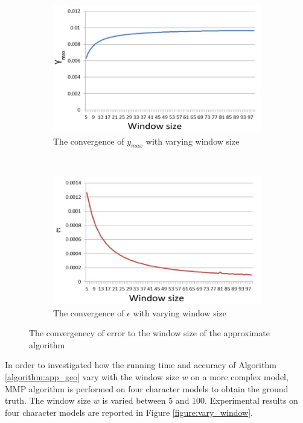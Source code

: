 \begin{figure}[H]
        \centering
        \begin{subfigure}[b]{0.5\textwidth}
                \includegraphics[width=\textwidth]{../images/geodesic_image/app_error1}
                \caption{The convergence of $y_{max}$ with varying window size}
                \label{figure:geo_app_error1}
        \end{subfigure}%
        ~ 
        \begin{subfigure}[b]{0.5\textwidth}
                \includegraphics[width=\textwidth]{../images/geodesic_image/app_error2}
                \caption{The convergence of $\epsilon$ with varying window size}
                \label{figure:geo_app_error2}
        \end{subfigure}
        \caption{The convergenecy of error to the window size of the approximate algorithm}\label{figure:geo_app_error}
\end{figure}

In order to investigated how the running time and accuracy of Algorithm \ref{algorithm:app_geo} vary with the window size $w$ on a more complex model, MMP algorithm is performed on four character models to obtain the ground truth. The window size $w$ is varied between 5 and 100. Experimental results on four character models are reported in Figure \ref{figure:vary_window}. 



